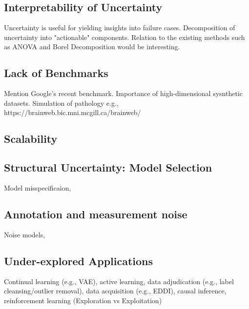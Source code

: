\subsection{Interpretability of Uncertainty} 
Uncertainty is useful for yielding insights into failure cases. Decomposition of uncertainty into "actionable" components. Relation to the existing methods such as ANOVA and Borel Decomposition would be interesting. 

\subsection{Lack of Benchmarks}
Mention Google's recent benchmark. Importance of high-dimensional sysnthetic datasets. 
Simulation of pathology e.g., https://brainweb.bic.mni.mcgill.ca/brainweb/

\subsection{Scalability}

\subsection{Structural Uncertainty: Model Selection}
Model misspecificaion,  

\subsection{Annotation and measurement noise} 
Noise models, 

\subsection{Under-explored Applications} 
Continual learning (e.g., VAE), active learning, data adjudication (e.g., label cleansing/outlier removal), data acquisition (e.g., EDDI), causal inference, reinforcement learning (Exploration vs Exploitation)
 